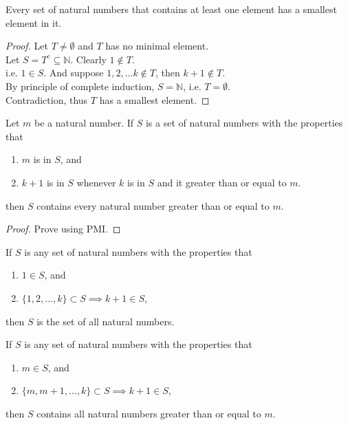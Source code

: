 \documentclass[11pt]{article}
\begin{document}
		\begin{theorem}
			Every set of natural numbers that contains at least one element has a smallest element in it.
		\end{theorem}
		\begin{proof}
			Let $T \neq \emptyset$ and $T$ has no minimal element. \\
			Let $S = T^c \subseteq \mathbb{N}$. Clearly $1 \notin T$. \\
			i.e. $1 \in S$. And suppose $1,2, \dots k \notin T$, then $k+1 \notin T$. \\
			By principle of complete induction, $S = \mathbb{N}$, i.e. $T = \emptyset$. \\
			Contradiction, thus $T$ has a smallest element.
		\end{proof}
		
		\begin{theorem}
			Let $m$ be a natural number. If $S$ is a set of natural numbers with the properties that
			\begin{enumerate}
				\item $m$ is in $S$, and
				\item $k+1$ is in $S$ whenever $k$ is in $S$ and it greater than or equal to $m$.
			\end{enumerate}
			then $S$ contains every natural number greater than or equal to $m$.
		\end{theorem}
		\begin{proof}
			Prove using PMI.
		\end{proof}
		
		\begin{theorem}
			If $S$ is any set of natural numbers with the properties that
			\begin{enumerate}
				\item $1 \in S$, and
				\item $\{1, 2, \dots, k\} \subset S \implies k+1 \in S$,
			\end{enumerate}
			then $S$ is the set of all natural numbers.
		\end{theorem}
		
		\begin{theorem}
			If $S$ is any set of natural numbers with the properties that
			\begin{enumerate}
				\item $m \in S$, and
				\item $\{m, m+1, \dots, k\} \subset S \implies k+1 \in S$,
			\end{enumerate}
			then $S$ contains all natural numbers greater than or equal to $m$.
		\end{theorem}
		
\end{document}
